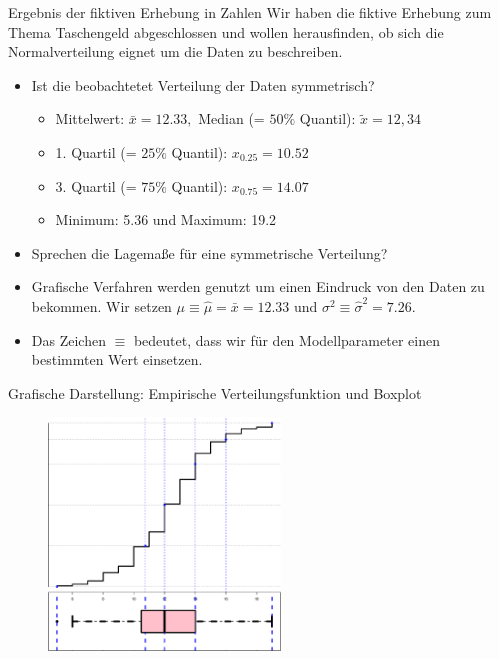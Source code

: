 \documentclass[usenames,dvipsnames,handout]{beamer}
\begin{document}
\begin{frame}{Ergebnis der fiktiven Erhebung in Zahlen}
Wir haben die fiktive Erhebung zum Thema Taschengeld abgeschlossen und wollen herausfinden,
ob sich die Normalverteilung eignet um die Daten zu beschreiben.
\begin{itemize}
\item{Ist die beobachtetet Verteilung der Daten symmetrisch?}
\begin{itemize}
\item{Mittelwert: $\bar{x}=12.33,$ Median (= $50\%$ Quantil): $\tilde{x}=12,34$}\pause
\item{1. Quartil (= $25\%$ Quantil): $x_{0.25}=10.52$}\pause
\item{3. Quartil (= $75\%$ Quantil): $x_{0.75}=14.07$}\pause
\item{Minimum: 5.36 und Maximum: 19.2}\pause
\end{itemize}
\item{Sprechen die Lagemaße für eine symmetrische Verteilung?}\pause
\item{Grafische Verfahren werden genutzt um einen Eindruck von den Daten zu bekommen. Wir setzen $\mu \equiv \hat{\mu}=\bar{x}=12.33$ und $\sigma^{2} \equiv \hat{\sigma}^{2}=7.26.$}\pause
\item{Das Zeichen $\equiv$ bedeutet, dass wir für den Modellparameter einen bestimmten Wert einsetzen.}
\end{itemize}
\end{frame}
%
%
%



\begin{frame}{Grafische Darstellung: Empirische Verteilungsfunktion und Boxplot}
        \begin{figure}[ht]
 	\centering
 	      \includegraphics[width=0.55\textwidth]{taschengeld_box.pdf}
 	\end{figure}
\end{frame}
\end{document}
